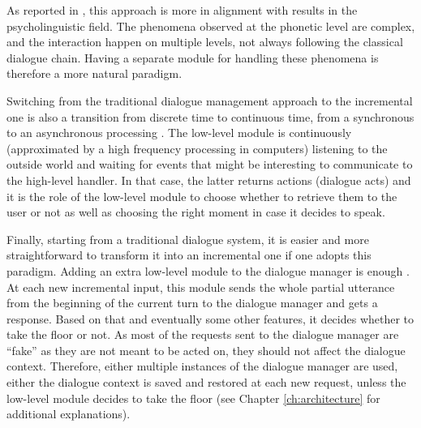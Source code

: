 As reported in \cite{Lemon2003}, this approach is more in alignment with results in the psycholinguistic field. The phenomena observed at the phonetic level are complex, and the interaction happen on multiple levels, not always following the classical dialogue chain. Having a separate module for handling these phenomena is therefore a more natural paradigm.

Switching from the traditional dialogue management approach to the incremental one is also a transition from discrete time to continuous time, from a synchronous to an asynchronous processing \cite{Raux2007}. The low-level module is continuously (approximated by a high frequency processing in computers) listening to the outside world and waiting for events that might be interesting to communicate to the high-level handler. In that case, the latter returns actions (dialogue acts) and it is the role of the low-level module to choose whether to retrieve them to the user or not as well as choosing the right moment in case it decides to speak.

Finally, starting from a traditional dialogue system, it is easier and more straightforward to transform it into an incremental one if one adopts this paradigm. Adding an extra low-level module to the dialogue manager is enough \cite{Selfridge2012a}. At each new incremental input, this module sends the whole partial utterance from the beginning of the current turn to the dialogue manager and gets a response. Based on that and eventually some other features, it decides whether to take the floor or not. As most of the requests sent to the dialogue manager are ``fake'' as they are not meant to be acted on, they should not affect the dialogue context. Therefore, either multiple instances of the dialogue manager are used, either the dialogue context is saved and restored at each new request, unless the low-level module decides to take the floor (see Chapter \ref{ch:architecture} for additional explanations).
